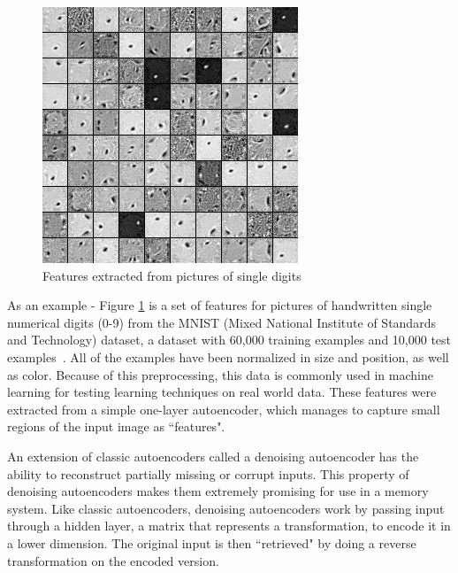 \documentclass{sig-alternate}
\begin{document}
\begin{figure}[h]
	\begin{center}
		\includegraphics[width=0.75\linewidth]{filters_corruption_30.png}
	\end{center}
	\vspace{-12pt}
	\caption{Features extracted from pictures of single digits}
	\label{fig:features}
\end{figure}

As an example - Figure \ref{fig:features} is a set of features for pictures of handwritten single 
numerical digits (0-9) from the MNIST (Mixed National Institute of Standards and Technology) dataset, 
a dataset with 60,000 training examples and 10,000 test examples~\cite{denoise}. 
All of the examples have been normalized in size and position, as well as 
color. Because of this preprocessing, this data is commonly used in machine learning for testing learning 
techniques on real world data.  These features were extracted from a simple one-layer autoencoder, 
which manages to capture small regions of the input image as ``features". 

An extension of classic autoencoders called a denoising autoencoder has the ability to reconstruct 
partially missing or corrupt inputs. This property of denoising autoencoders makes them extremely 
promising for use in a memory system. Like classic autoencoders, 
denoising autoencoders work by passing input through a hidden 
layer, a matrix that represents a transformation, to encode it in a lower dimension. The original 
input is then ``retrieved" by doing a reverse transformation on the encoded version.~\cite{denoise}
\end{document}
